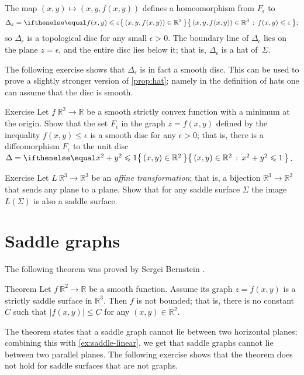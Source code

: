 The map $(x,y)\mapsto (x,y,f(x,y))$ defines a homeomorphism from $F_\epsilon$
to
\[\Delta_\epsilon=\set{(x,y,f(x,y))\in \mathbb{R}^3}{f(x,y)\le \epsilon};\]
so $\Delta_\epsilon$ is a topological disc for any small $\epsilon>0$.
The boundary line of $\Delta_\epsilon$ lies on the plane $z=\epsilon$, and the entire disc lies below it;
that is, $\Delta_\epsilon$ is a hat of~$\Sigma$.
\qeds

The following exercise shows that $\Delta_\epsilon$ is in fact a smooth disc.
This can be used to prove a slightly stronger version of \ref{prop:hat};
namely in the definition of hats one can assume that the disc is smooth.

\begin{thm}{Exercise}\label{ex:disc-hat}
Let $f\:\mathbb{R}^2\to\mathbb{R}$ be a smooth strictly convex function with a minimum at the origin.
Show that the set $F_\epsilon$ in the graph $z=f(x,y)$ defined by the inequality $f(x,y)\le \epsilon$ is a smooth disc for any $\epsilon>0$;
that is, there is a diffeomorphism 
$F_\epsilon$ to the unit disc $\Delta\z=\set{(x,y)\in\mathbb{R}^2}{x^2+y^2\le 1}$.
\end{thm}

\begin{thm}{Exercise}\label{ex:saddle-linear}
Let $L\:\mathbb{R}^3\to\mathbb{R}^3$ be an \emph{affine transformation}; that is, a bijection $\mathbb{R}^3\to\mathbb{R}^3$ that sends any plane to a plane.
Show that for any saddle surface $\Sigma$ the image $L(\Sigma)$ is also a saddle surface.
\end{thm}



\section{Saddle graphs}

The following theorem was proved by Sergei Bernstein \cite{bernstein}.

\begin{thm}{Theorem}\label{thm:bernshtein}
Let $f\:\mathbb{R}^2\to\mathbb{R}$ be a smooth function.
Assume its graph $z=f(x,y)$ is a strictly saddle surface in $\mathbb{R}^3$.
Then $f$ is not bounded;
that is, there is no constant $C$ such that 
$|f(x,y)|\le C$ for any $(x,y)\in\mathbb{R}^2$.
\end{thm}

The theorem states that a saddle graph cannot lie between two horizontal planes;
combining this with \ref{ex:saddle-linear}, we get that saddle graphs cannot lie between two parallel planes.
The following exercise shows that the theorem does not hold for saddle surfaces that are not graphs.



